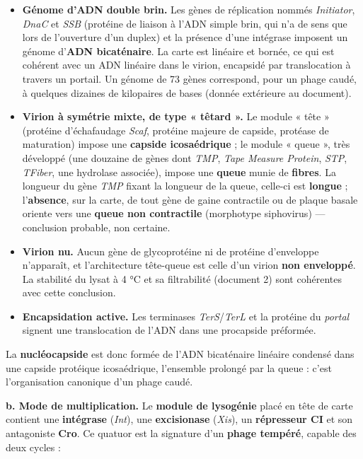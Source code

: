 \documentclass[11pt,a4paper]{article}
\providecommand{\tightlist}{\setlength{\itemsep}{0pt}\setlength{\parskip}{0pt}}
\begin{document}
\begin{itemize}
\tightlist
\item
  \textbf{Génome d'ADN double brin.} Les gènes de réplication nommés \emph{Initiator}, \emph{DnaC} et \emph{SSB} (protéine de liaison à l'ADN simple brin, qui n'a de sens que lors de l'ouverture d'un duplex) et la présence d'une intégrase imposent un génome d'\textbf{ADN bicaténaire}. La carte est linéaire et bornée, ce qui est cohérent avec un ADN linéaire dans le virion, encapsidé par translocation à travers un portail. Un génome de 73 gènes correspond, pour un phage caudé, à quelques dizaines de kilopaires de bases (donnée extérieure au document).
\item
  \textbf{Virion à symétrie mixte, de type « têtard ».} Le module « tête » (protéine d'échafaudage \emph{Scaf}, protéine majeure de capside, protéase de maturation) impose une \textbf{capside icosaédrique} ; le module « queue », très développé (une douzaine de gènes dont \emph{TMP}, \emph{Tape Measure Protein}, \emph{STP}, \emph{TFiber}, une hydrolase associée), impose une \textbf{queue} munie de \textbf{fibres}. La longueur du gène \emph{TMP} fixant la longueur de la queue, celle-ci est \textbf{longue} ; l'\textbf{absence}, sur la carte, de tout gène de gaine contractile ou de plaque basale oriente vers une \textbf{queue non contractile} (morphotype siphovirus) --- conclusion probable, non certaine.
\item
  \textbf{Virion nu.} Aucun gène de glycoprotéine ni de protéine d'enveloppe n'apparaît, et l'architecture tête-queue est celle d'un virion \textbf{non enveloppé}. La stabilité du lysat à 4 °C et sa filtrabilité (document 2) sont cohérentes avec cette conclusion.
\item
  \textbf{Encapsidation active.} Les terminases \emph{TerS}/\emph{TerL} et la protéine du \emph{portal} signent une translocation de l'ADN dans une procapside préformée.
\end{itemize}

La \textbf{nucléocapside} est donc formée de l'ADN bicaténaire linéaire condensé dans une capside protéique icosaédrique, l'ensemble prolongé par la queue : c'est l'organisation canonique d'un phage caudé.

\textbf{b. Mode de multiplication.} Le \textbf{module de lysogénie} placé en tête de carte contient une \textbf{intégrase} (\emph{Int}), une \textbf{excisionase} (\emph{Xis}), un \textbf{répresseur CI} et son antagoniste \textbf{Cro}. Ce quatuor est la signature d'un \textbf{phage tempéré}, capable des deux cycles :
\end{document}
